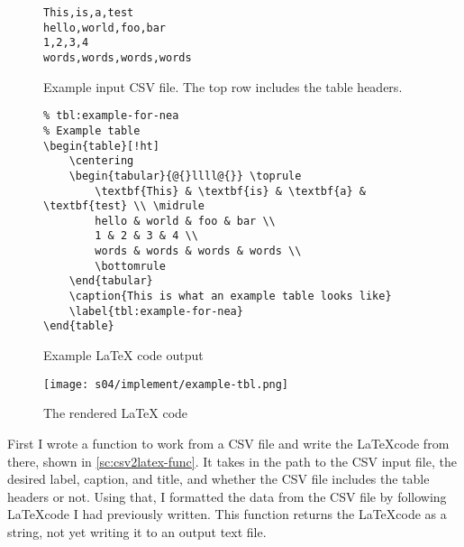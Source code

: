         \begin{figure}[!ht]
            \begin{verbatim}
This,is,a,test
hello,world,foo,bar
1,2,3,4
words,words,words,words
            \end{verbatim}
            \caption{Example input CSV file. The top row includes the table headers.}
            \label{pc:csv2latex-example-input-csv}
        \end{figure}


        \begin{figure}[!ht]
            \begin{verbatim}
% tbl:example-for-nea
% Example table
\begin{table}[!ht]
    \centering
    \begin{tabular}{@{}llll@{}} \toprule
        \textbf{This} & \textbf{is} & \textbf{a} & \textbf{test} \\ \midrule 
        hello & world & foo & bar \\ 
        1 & 2 & 3 & 4 \\ 
        words & words & words & words \\ 
        \bottomrule
    \end{tabular}
    \caption{This is what an example table looks like}
    \label{tbl:example-for-nea}
\end{table}
            \end{verbatim}
            \caption{Example LaTeX code output}
            \label{pc:csv2latex-example-output-latex}
        \end{figure}


        \begin{figure}[!ht]
            \centering
            \texttt{[image: s04/implement/example-tbl.png]}
            \caption{The rendered LaTeX code}
            \label{fig:rendered-csv2latex-table}
        \end{figure}

        First I wrote a function to work from a CSV file and write the \LaTeX code from there, shown in \autoref{sc:csv2latex-func}. 
        It takes in the path to the CSV input file, the desired label, caption, and title, and whether the CSV file includes the table headers or not. 
        Using that, I formatted the data from the CSV file by following \LaTeX code I had previously written. 
        This function returns the \LaTeX code as a string, not yet writing it to an output text file. 

